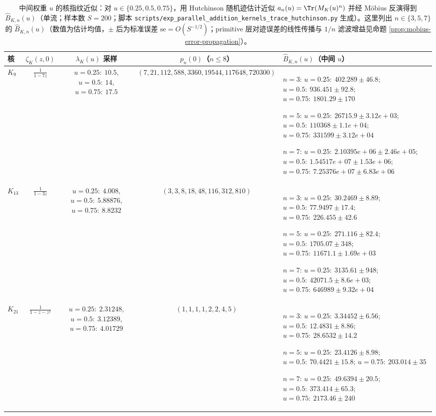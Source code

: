 \begin{table}[H]
\centering
\scriptsize
\setlength{\tabcolsep}{6pt}
\renewcommand{\arraystretch}{1.15}
\caption{中间权重 $u$ 的核指纹近似：对 $u\in\{0.25,0.5,0.75\}$，用 Hutchinson 随机迹估计近似 $a_n(u)=\Tr(M_K(u)^n)$ 并经 Möbius 反演得到 $\widehat B_{K,n}(u)$（单流；样本数 $S=200$；脚本 \texttt{scripts/exp\_parallel\_addition\_kernels\_trace\_hutchinson.py} 生成）。这里列出 $n\in\{3,5,7\}$ 的 $\widehat B_{K,n}(u)$（数值为估计均值，$\pm$ 后为标准误差 $\mathrm{se}=O(S^{-1/2})$；primitive 层对迹误差的线性传播与 $1/n$ 滤波增益见命题 \ref{prop:mobius-error-propagation}）。}
\label{tab:parallel-addition-kernels-fingerprint-u-samples}
\begin{tabular}{@{}lccc p{}@{}}
\toprule
核 & $\zeta_K(z,0)$ & $\lambda_K(u)$ 采样 & $p_n(0)$（$n\le 8$） & $\widehat B_{K,n}(u)$（中间 $u$） \\
\midrule
$K_{9}$ & $\frac{1}{1-7z}$ & $u=0.25:\ 10.5$, $u=0.5:\ 14$, $u=0.75:\ 17.5$ & $(7,21,112,588,3360,19544,117648,720300)$ & $n=3$: $u=0.25:\ 402.289 \pm 46.8$; $u=0.5:\ 936.451 \pm 92.8$; $u=0.75:\ 1801.29 \pm 170$\par $n=5$: $u=0.25:\ 26715.9 \pm 3.12e+03$; $u=0.5:\ 110368 \pm 1.1e+04$; $u=0.75:\ 331599 \pm 3.12e+04$\par $n=7$: $u=0.25:\ 2.10395e+06 \pm 2.46e+05$; $u=0.5:\ 1.54517e+07 \pm 1.53e+06$; $u=0.75:\ 7.25376e+07 \pm 6.83e+06$ \\
$K_{13}$ & $\frac{1}{1-3z}$ & $u=0.25:\ 4.008$, $u=0.5:\ 5.88876$, $u=0.75:\ 8.8232$ & $(3,3,8,18,48,116,312,810)$ & $n=3$: $u=0.25:\ 30.2469 \pm 8.89$; $u=0.5:\ 77.9497 \pm 17.4$; $u=0.75:\ 226.455 \pm 42.6$\par $n=5$: $u=0.25:\ 271.116 \pm 82.4$; $u=0.5:\ 1705.07 \pm 348$; $u=0.75:\ 11671.1 \pm 1.69e+03$\par $n=7$: $u=0.25:\ 3135.61 \pm 948$; $u=0.5:\ 42071.5 \pm 8.6e+03$; $u=0.75:\ 646989 \pm 9.32e+04$ \\
$K_{21}$ & $\frac{1}{1-z-z^2}$ & $u=0.25:\ 2.31248$, $u=0.5:\ 3.12389$, $u=0.75:\ 4.01729$ & $(1,1,1,1,2,2,4,5)$ & $n=3$: $u=0.25:\ 3.34452 \pm 6.56$; $u=0.5:\ 12.4831 \pm 8.86$; $u=0.75:\ 28.6532 \pm 14.2$\par $n=5$: $u=0.25:\ 23.4126 \pm 8.98$; $u=0.5:\ 70.4421 \pm 15.8$; $u=0.75:\ 203.014 \pm 35$\par $n=7$: $u=0.25:\ 49.6394 \pm 20.5$; $u=0.5:\ 373.414 \pm 65.3$; $u=0.75:\ 2173.46 \pm 240$ \\
\bottomrule
\end{tabular}
\end{table}
